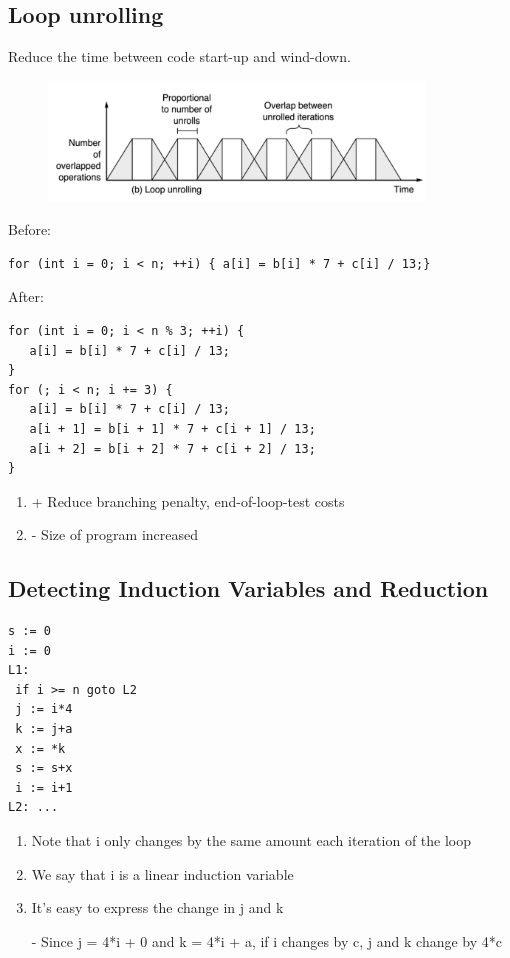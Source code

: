 \documentclass[a4paper]{article}
\theoremstyle{definition}
\begin{document}
\subsection{Loop unrolling}
Reduce the time between code start-up and wind-down.
\begin{figure}[htbp]
  \centering
  \includegraphics[width=10cm]{./img/loop_unroll.png}
\end{figure}
Before:
\begin{verbatim}
for (int i = 0; i < n; ++i) { a[i] = b[i] * 7 + c[i] / 13;}
\end{verbatim}
After:
\begin{verbatim}
for (int i = 0; i < n % 3; ++i) {
   a[i] = b[i] * 7 + c[i] / 13;
}
for (; i < n; i += 3) { 
   a[i] = b[i] * 7 + c[i] / 13;
   a[i + 1] = b[i + 1] * 7 + c[i + 1] / 13; 
   a[i + 2] = b[i + 2] * 7 + c[i + 2] / 13;
}
\end{verbatim}
\begin{enumerate}
    \item + Reduce branching penalty, end-of-loop-test costs 
    \item - Size of program increased
\end{enumerate}
\subsection{Detecting Induction Variables and Reduction}
\begin{verbatim}
s := 0 
i := 0
L1:
 if i >= n goto L2 
 j := i*4   
 k := j+a 
 x := *k 
 s := s+x  
 i := i+1
L2: ...
\end{verbatim}
\begin{enumerate}
    \item Note that i only changes by the same amount each iteration of the loop 
    \item We say that i is a linear induction variable
    \item It’s easy to express the change in j and k
    
    - Since j = 4*i + 0 and k = 4*i + a, if i changes by c, j and k change by 4*c
\end{enumerate}
\end{document}

